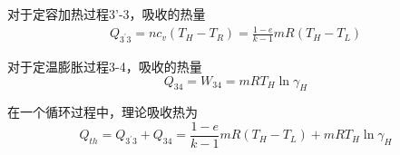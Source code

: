 对于定容加热过程3'-3，吸收的热量
\begin{equation}
	\begin{split}
		Q_{3^{'}3} = nc_v(T_H-T_R)
		=\frac{1-e}{k-1}mR(T_H-T_L)
	\end{split}
\end{equation}


对于定温膨胀过程3-4，吸收的热量
\begin{equation}
	Q_{34} = W_{34} = mRT_H\ln\gamma_H
\end{equation}

在一个循环过程中，理论吸收热为
\begin{equation}
	Q_{th} = Q_{3^{'}3} + Q_{34} = \frac{1-e}{k-1}mR(T_H-T_L) + mRT_H\ln\gamma_H
\end{equation}


%
%

%
%
%

